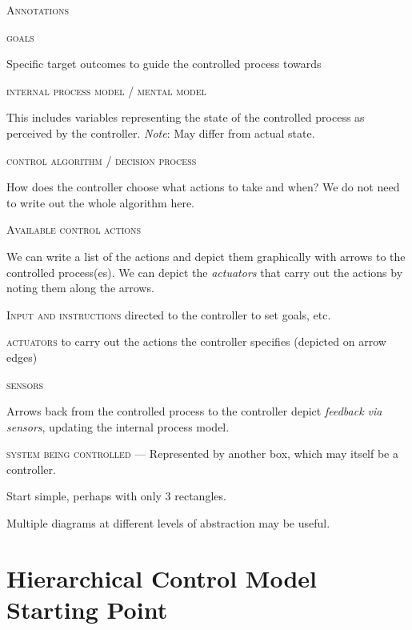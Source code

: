 \documentclass[letterpaper]{tufte-book}
\begin{document}
\textsc{Annotations}
\begin{compactitem}
\setlength{\itemsep}{0pt}
\setlength{\parskip}{.25em}
\item \textsc{goals} 

Specific target outcomes to guide the controlled process towards
\item \textsc{internal process model / mental model}

This includes variables representing the state of the controlled process as perceived by the controller. \emph{Note}: May differ from actual state.
\item \textsc{control algorithm / decision process}

How does the controller choose what actions to take and when?
We do not need to write out the whole algorithm here.
\item \textsc{Available control actions}

We can write a list of the actions and depict them graphically with arrows to the controlled process(es).
We can depict the \emph{actuators} that carry out the actions by noting them along the arrows.
\end{compactitem}

\begin{compactitem}
\item \textsc{Input and instructions} directed to the controller to set goals, etc.
\item \textsc{actuators} to carry out the actions the controller specifies (depicted on arrow edges)
\item \textsc{sensors}

Arrows back from the controlled process to the controller depict \emph{feedback via sensors}, updating the internal process model.
\item \textsc{system being controlled} --- Represented by another box, which may itself be a controller.
\end{compactitem}  

\begin{compactitem}
\setlength{\itemsep}{0pt}
\setlength{\parskip}{.25em}
\item Start simple, perhaps with only 3 rectangles.
\item Multiple diagrams at different levels of abstraction may be useful.
\end{compactitem}  

\section{Hierarchical Control Model Starting Point}
\end{document}
